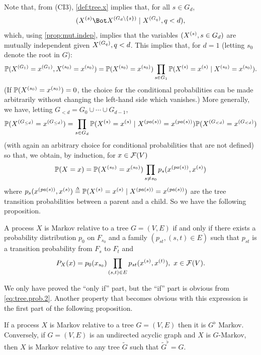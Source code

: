 Note that, from (CI3), \cref{def:tree.x} implies that, for all $s\in G_d$,
\[
\cind{\pe Xs}{\pe X{G_d\setm\{s\}}}{\pe X{G_q}, q<d},
\]
which, using 
\cref{prop:mut.indep}, implies that the variables $(X^{(s)}, s\in G_d)$ are
mutually independent given $X^{(G_q)}, q<d$. This implies that, for
$d=1$ (letting $s_0$ denote the root in $G$):
$$
\bm{\mathbb P}(X^{(G_1)}=x^{(G_1)}, X^{(s_0)}=x^{(s_0)}) = \bm{\mathbb P}(X^{(s_0)}= x^{(s_0)})\prod_{s\in
G_1} \bm{\mathbb P}(X^{(s)} = x^{(s)}\mid X^{(s_0)}= x^{(s_0)}).
$$
(If $\bm{\mathbb P}(X^{(s_0)}= x^{(s_0)})=0$, the choice for the conditional
probabilities can be made arbitrarily without changing the left-hand
side which vanishes.)
More generally, we have, letting $G_{<d} = G_0\cup
\cdots\cup G_{d-1}$,
$$
\bm{\mathbb P}(X^{(G_{\leq d})} = x^{(G_{\leq d})}) = \prod_{s\in G_d} \bm{\mathbb P}(X^{(s)}= x^{(s)} \mid
X^{({\mathit{pa}(s)})} = x^{({\mathit{pa}(s)})}) \bm{\mathbb P}(X^{(G_{< d})} = x^{(G_{< d})})
$$
(with again an arbitrary choice for conditional probabilities that
are not defined) so that, we obtain, by induction, for $x\in {\mathcal F}(V)$
\begin{equation}
\label{eq:tree.prob}
\bm{\mathbb P}(X = x) = \bm{\mathbb P}(X^{(s_0)} = x^{(s_0)}) \prod_{s\neq s_0} p_s(x^{({\mathit{pa}(s)})}, x^{(s)})
\end{equation}
where $p_s(x^{({\mathit{pa}(s)})}, x^{(s)}) \stackrel{{\scriptscriptstyle \Delta}}{=} \bm{\mathbb P}(X^{(s)}=x^{(s)} \mid
X^{({\mathit{pa}(s)})} = x^{({\mathit{pa}(s)})})$ are the tree transition probabilities between a
parent and a child. So we have the following proposition.
\begin{proposition}
\label{prop:tree.rep}
A process $X$ is Markov relative to a tree $G=(V,E)$ if and only
if there exists a probability distribution $p_0$ on $F_{s_0}$ and a family $(p_{st}, (s,t)\in E)$
such that $p_{st}$ is a transition probability from $F_s$ to $F_t$ and
\begin{equation}
\label{eq:tree.prob.2}
P_X(x) = p_0(x_{s_0})\prod_{(s,t)\in E} p_{st}(x^{(s)}, x^{(t)}), \ x\in {\mathcal F}(V).
\end{equation}
\end{proposition}
We only have proved the ``only if'' part, but the ``if'' part is obvious from
\cref{eq:tree.prob.2}. Another property that becomes obvious with
this expression is the first part of the following proposition.
\begin{proposition}
\label{prop:tree.undir}
If a process $X$ is Markov relative to a tree $G=(V,E)$ then it is
 $G^\flat$ Markov.
Conversely, if $G=(V,E)$ is an undirected acyclic graph and $X$ is
$G$-Markov, then $X$ is Markov relative to any tree $\tilde G$ such
that $\tilde G^\flat = G$.  
\end{proposition}
